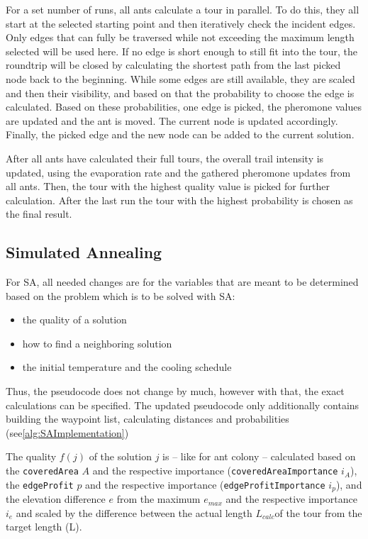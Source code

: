 For a set number of runs, all ants calculate a tour in parallel. 
To do this, they all start at the selected starting point and then iteratively check the incident edges.
Only edges that can fully be traversed while not exceeding the maximum length selected will be used here.
If no edge is short enough to still fit into the tour, the roundtrip will be closed by calculating the shortest path from the last picked node back to the beginning.
While some edges are still available, they are scaled and then their visibility, and based on that the probability to choose the edge is calculated. 
Based on these probabilities, one edge is picked, the pheromone values are updated and the ant is moved.
The current node is updated accordingly. 
Finally, the picked edge and the new node can be added to the current solution.

After all ants have calculated their full tours, the overall trail intensity is updated, using the evaporation rate and the gathered pheromone updates from all ants. 
Then, the tour with the highest quality value is picked for further calculation. 
After the last run the tour with the highest probability is chosen as the final result.



\subsection{Simulated Annealing}
\label{subsec:simulatedAnnealingImplementation}

For SA, all needed changes are for the variables that are meant to be determined based on the problem which is to be solved with SA:
\begin{itemize}
	\item the quality of a solution
	\item how to find a neighboring solution
	\item the initial temperature and the cooling schedule
\end{itemize} 

Thus, the pseudocode does not change by much, however with that, the exact calculations can be specified. 
The updated pseudocode only additionally contains building the waypoint list, calculating distances and probabilities (see\ref{alg:SAImplementation})

The quality $f(j)$ of the solution $j$ is -- like for ant colony -- calculated based on the \texttt{coveredArea} $A$ and the respective importance (\texttt{coveredAreaImportance} $i_A$), the \texttt{edgeProfit} $p$ and the respective importance (\texttt{edgeProfitImportance} $i_p$), and the elevation difference $e$ from the maximum $e_{max}$ and the respective importance $i_e$ and scaled by the difference between the actual length $L_{calc}$of the tour from the target length (L). 

